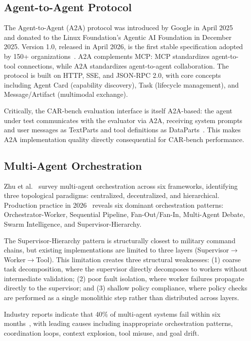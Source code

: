 \documentclass{article}
\begin{document}
\subsection{Agent-to-Agent Protocol}

The Agent-to-Agent (A2A) protocol was introduced by Google in April 2025~\cite{googlecloud2025} and donated to the Linux Foundation's Agentic AI Foundation in December 2025. Version 1.0, released in April 2026, is the first stable specification adopted by 150+ organizations~\cite{agentmarketcap2026}. A2A complements MCP: MCP standardizes agent-to-tool connections, while A2A standardizes agent-to-agent collaboration. The protocol is built on HTTP, SSE, and JSON-RPC 2.0, with core concepts including Agent Card (capability discovery), Task (lifecycle management), and Message/Artifact (multimodal exchange).

Critically, the CAR-bench evaluation interface is itself A2A-based: the agent under test communicates with the evaluator via A2A, receiving system prompts and user messages as TextParts and tool definitions as DataParts~\cite{carbenchagentbeats2026}. This makes A2A implementation quality directly consequential for CAR-bench performance.

\subsection{Multi-Agent Orchestration}

Zhu et al.~\cite{zhu2026} survey multi-agent orchestration across six frameworks, identifying three topological paradigms: centralized, decentralized, and hierarchical. Production practice in 2026~\cite{devto2026} reveals six dominant orchestration patterns: Orchestrator-Worker, Sequential Pipeline, Fan-Out/Fan-In, Multi-Agent Debate, Swarm Intelligence, and Supervisor-Hierarchy.

The Supervisor-Hierarchy pattern is structurally closest to military command chains, but existing implementations are limited to three layers (Supervisor$\rightarrow$Worker$\rightarrow$Tool). This limitation creates three structural weaknesses: (1) coarse task decomposition, where the supervisor directly decomposes to workers without intermediate validation; (2) poor fault isolation, where worker failures propagate directly to the supervisor; and (3) shallow policy compliance, where policy checks are performed as a single monolithic step rather than distributed across layers.

Industry reports indicate that 40\% of multi-agent systems fail within six months~\cite{beamai2026}, with leading causes including inappropriate orchestration patterns, coordination loops, context explosion, tool misuse, and goal drift.
\end{document}
